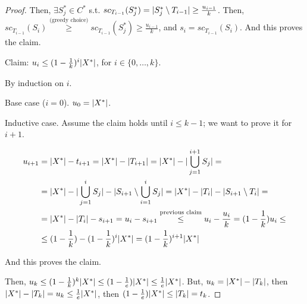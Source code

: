 \begin{proof}
        Then, $\exists S_j^* \in C^*$ s.t. $sc_{T_{i-1}}(S_j^*) = \vert S_j^* \setminus T_{i-1} \vert \geq \frac{u_{i-1}}{k}$.
        Then, $sc_{T_{i-1}}(S_i) \overset{\text{(greedy choice)}}{\geq} sc_{T_{i-1}}(S_j^*) \geq \frac{u_{i-1}}{k}$, and $s_i = sc_{T_{i-1}}(S_i)$. And this proves the claim.

        Claim: $u_i \leq (1 - \frac{1}{k})^i \vert X^* \vert$, for $i \in \{ 0, \dots, k \}$.

        By induction on $i$.

        Base case ($i=0$). $u_0 = \vert X^* \vert$.

        Inductive case. Assume the claim holds until $i \leq k-1$; we want to prove it for $i+1$.

        
        \begin{equation*}
            \begin{split}
                u_{i+1} &= \vert X^* \vert - t_{i+1} = \vert X^* \vert - \vert T_{i+1} \vert = \vert X^* \vert - \vert \bigcup_{j=1}^{i+1} S_j \vert =\\
                        &= \vert X^* \vert - \vert \bigcup_{j=1}^{i} S_j \vert - \vert S_{i+1} \setminus \bigcup_{i=1}^i S_j \vert = \vert X^* \vert - \vert T_i \vert - \vert S_{i+1} \setminus T_i \vert =\\
                        &= \vert X^* \vert - \vert T_i \vert - s_{i+1} = u_i - s_{i+1} \overset{\text{previous claim}}{\leq} u_i - \frac{u_i}{k} = (1 - \frac{1}{k})u_i \leq\\
                        &\leq (1 - \frac{1}{k}) - (1 - \frac{1}{k})^i \vert X^* \vert = (1 - \frac{1}{k})^{i+1} \vert X^* \vert
            \end{split}
        \end{equation*}

        And this proves the claim.

        Then, $u_k \leq (1 - \frac{1}{k})^k \vert X^* \vert \leq (1 - \frac{1}{e}) \vert X^* \vert \leq \frac{1}{e} \vert X^* \vert$.
        But, $u_k = \vert X^* \vert - \vert T_k \vert$, then $\vert X^* \vert - \vert T_k \vert = u_k \leq \frac{1}{e} \vert X^* \vert$, then $(1 - \frac{1}{e}) \vert X^* \vert \leq \vert T_k \vert = t_k$.
        
    \end{proof}


